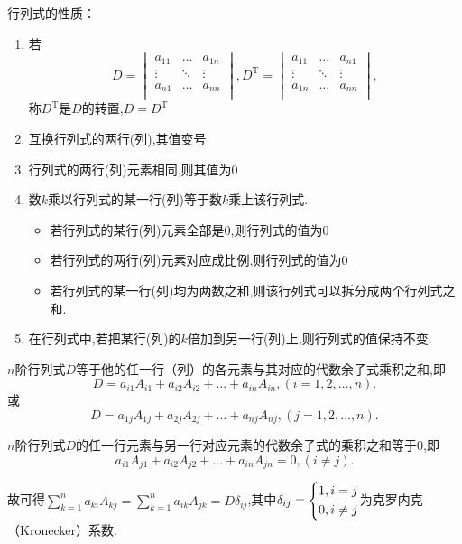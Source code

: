 行列式的性质：
\begin{enumerate}
    \item 若
    \begin{equation*}
        D=\begin{vmatrix}
            a_{11}   &   \dots   &   a_{1n}   \\
            \vdots   &   \ddots   &   \vdots   \\
            a_{n1}   &   \dots   &   a_{nn}   \\
        \end{vmatrix},
        D^\mathrm{T}=\begin{vmatrix}
            a_{11}   &   \dots   &   a_{n1}   \\
            \vdots   &   \ddots   &   \vdots   \\
            a_{1n}   &   \dots   &   a_{nn}   \\
        \end{vmatrix},
    \end{equation*}
    称$D^\mathrm{T}$是$D$的转置,$D=D^\mathrm{T}$
    \item 互换行列式的两行(列),其值变号
    \item 行列式的两行(列)元素相同,则其值为$0$
    \item 数$k$乘以行列式的某一行(列)等于数$k$乘上该行列式.
    \begin{itemize}
        \item 若行列式的某行(列)元素全部是0,则行列式的值为0
        \item 若行列式的两行(列)元素对应成比例,则行列式的值为0
        \item 若行列式的某一行(列)均为两数之和,则该行列式可以拆分成两个行列式之和.
    \end{itemize}
    \item 在行列式中,若把某行(列)的$k$倍加到另一行(列)上,则行列式的值保持不变.
\end{enumerate}
\begin{ttheorem}
    $n$阶行列式$D$等于他的任一行（列）的各元素与其对应的代数余子式乘积之和,即
    \begin{equation*}
        D=a_{i1}A_{i1}+a_{i2}A_{i2}+\dots+a_{in}A_{in},(i=1,2,\dots,n).
    \end{equation*}
    或
    \begin{equation*}
        D=a_{1j}A_{1j}+a_{2j}A_{2j}+\dots+a_{nj}A_{nj},(j=1,2,\dots,n).
    \end{equation*}
\end{ttheorem}
\begin{ttheorem}
    $n$阶行列式$D$的任一行元素与另一行对应元素的代数余子式的乘积之和等于0,即
    \begin{equation*}
        a_{i1}A_{j1}+a_{i2}A_{j2}+\dots+a_{in}A_{jn}=0,(i\neq j).
    \end{equation*}
\end{ttheorem}
故可得$\displaystyle \sum_{k=1}^{n} a_{ki}A_{kj}=\sum_{k=1}^{n} a_{ik}A_{jk}=D\delta _{ij}$,其中$\delta _{ij}=\begin{dcases}
    1,i=j\\
    0,i\neq j\\
\end{dcases}$为克罗内克（Kronecker）系数.

